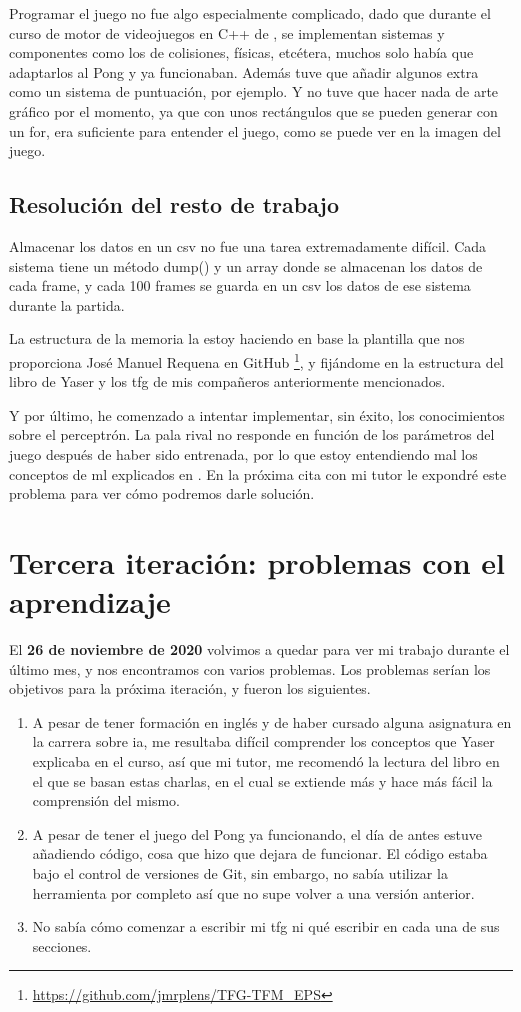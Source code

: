 Programar el juego no fue algo especialmente complicado, dado que durante el curso de motor de videojuegos en C++ de , se implementan sistemas y componentes como los de colisiones, físicas, etcétera, muchos solo había que adaptarlos al Pong y ya funcionaban. Además tuve que añadir algunos extra como un sistema de puntuación, por ejemplo. Y no tuve que hacer nada de arte gráfico por el momento, ya que con unos rectángulos que se pueden generar con un for, era suficiente para entender el juego, como se puede ver en la imagen del juego.

\subsection{Resolución del resto de trabajo}
Almacenar los datos en un \gls{csv} no fue una tarea extremadamente difícil. Cada sistema tiene un método dump() y un array donde se almacenan los datos de cada frame, y cada 100 frames se guarda en un \gls{csv} los datos de ese sistema durante la partida.

La estructura de la memoria la estoy haciendo en base la plantilla que nos proporciona José Manuel Requena en GitHub \footnote{\url{https://github.com/jmrplens/TFG-TFM\_EPS}}, y fijándome en la estructura del libro de Yaser y los \gls{tfg} de mis compañeros anteriormente mencionados.

Y por último, he comenzado a intentar implementar, sin éxito, los conocimientos sobre el perceptrón. La pala rival no responde en función de los parámetros del juego después de haber sido entrenada, por lo que estoy entendiendo mal los conceptos de \gls{ml} explicados en \citep{LearningFromData}. En la próxima cita con mi tutor le expondré este problema para ver cómo podremos darle solución.

\section{Tercera iteración: problemas con el aprendizaje}
El \textbf{26 de noviembre de 2020} volvimos a quedar para ver mi trabajo durante el último mes, y nos encontramos con varios problemas. Los problemas serían los objetivos para la próxima iteración, y fueron los siguientes.

\begin{enumerate}
	\item A pesar de tener formación en inglés y de haber cursado alguna asignatura en la carrera sobre \gls{ia}, me resultaba difícil comprender los conceptos que Yaser explicaba en el curso, así que mi tutor, me recomendó la lectura del libro en el que se basan estas charlas, en el cual se extiende más y hace más fácil la comprensión del mismo.
	\item A pesar de tener el juego del Pong ya funcionando, el día de antes estuve añadiendo código, cosa que hizo que dejara de funcionar. El código estaba bajo el control de versiones de Git, sin embargo, no sabía utilizar la herramienta por completo así que no supe volver a una versión anterior.
	\item No sabía cómo comenzar a escribir mi \gls{tfg} ni qué escribir en cada una de sus secciones.
\end{enumerate}

